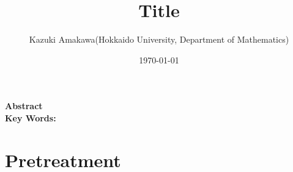 \documentclass[12pt]{article}
\title{Title}
\author{Kazuki Amakawa(Hokkaido University, Department of Mathematics)}
\date{\today}
\theoremstyle{plain}
\begin{document}
\maketitle
\noindent \textbf{Abstract}\\

\noindent \textbf{Key Words:} \\
\newpage

\section{Pretreatment}


%
%
\end{document}
